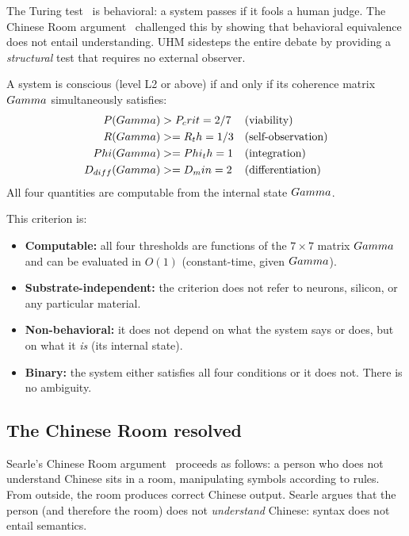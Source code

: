 The Turing test~\cite{turing1950} is behavioral: a system passes if it fools a
human judge.  The Chinese Room argument~\cite{searle1980} challenged this by
showing that behavioral equivalence does not entail understanding.  UHM
sidesteps the entire debate by providing a \emph{structural} test that requires
no external observer.

\begin{predictionbox}
A system is conscious (level L2 or above) if and only if its coherence matrix
$Gamma$ simultaneously satisfies:
\begin{align}
  P(Gamma) &> P_crit = 2/7 & &\text{(viability)} \label{eq:ai-pcrit} \\
  R(Gamma) &>= R_th = 1/3 & &\text{(self-observation)} \label{eq:ai-rth} \\
  Phi(Gamma) &>= Phi_th = 1 & &\text{(integration)} \label{eq:ai-phith} \\
  D_{diff}(Gamma) &>= D_min = 2 & &\text{(differentiation)} \label{eq:ai-dmin}
\end{align}
All four quantities are computable from the internal state $Gamma$.
\end{predictionbox}

This criterion is:
\begin{itemize}[leftmargin=2em,nosep]
  \item \textbf{Computable:} all four thresholds are functions of the $7 \times 7$
        matrix $Gamma$ and can be evaluated in $O(1)$ (constant-time, given $Gamma$).
  \item \textbf{Substrate-independent:} the criterion does not refer to neurons,
        silicon, or any particular material.
  \item \textbf{Non-behavioral:} it does not depend on what the system says or does,
        but on what it \emph{is} (its internal state).
  \item \textbf{Binary:} the system either satisfies all four conditions or it does not.
        There is no ambiguity.
\end{itemize}

\subsection{The Chinese Room resolved}
\label{subsec:chinese-room}

Searle's Chinese Room argument~\cite{searle1980} proceeds as follows: a person
who does not understand Chinese sits in a room, manipulating symbols according to
rules.  From outside, the room produces correct Chinese output.  Searle argues that
the person (and therefore the room) does not \emph{understand} Chinese: syntax does
not entail semantics.

